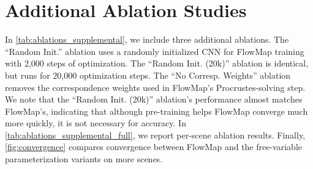 
\section{Additional Ablation Studies}




In \cref{tab:ablations_supplemental}, we include three additional ablations.
The ``Random Init.'' ablation uses a randomly initialized CNN for FlowMap training with 2,000 steps of optimization.
The ``Random Init. (20k)'' ablation is identical, but runs for 20,000 optimization steps.
The ``No Corresp. Weights'' ablation removes the correspondence weights used in FlowMap's Procrustes-solving step.
We note that the ``Random Init. (20k)'' ablation's performance almost matches FlowMap's, indicating that although pre-training helps FlowMap converge much more quickly, it is not necessary for accuracy.
In \cref{tab:ablations_supplemental_full}, we report per-scene ablation results.
Finally, \cref{fig:convergence} compares convergence between FlowMap and the free-variable parameterization variants on more scenes.


